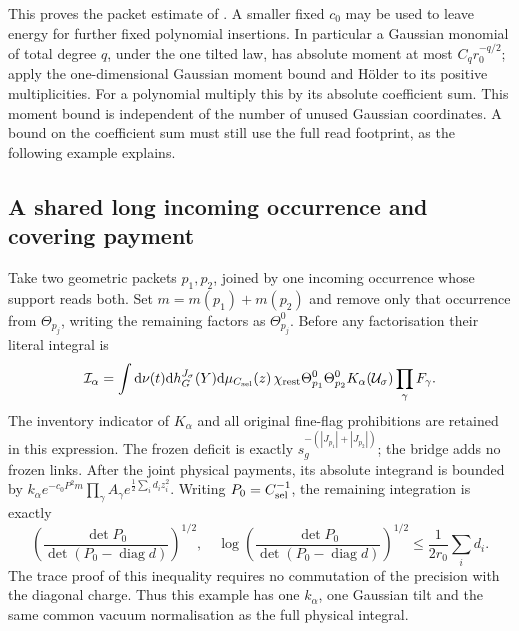 \documentclass[11pt,reqno]{amsart}
\numberwithin{equation}{section}
\theoremstyle{definition}
\theoremstyle{remark}
\newcommand{\dd}{\mathrm d}
\begin{document}
This proves the packet estimate of
\cite[Theorem~30.8, p.~182]{Main}. A smaller fixed \(c_0\)
may be used to leave energy for further fixed polynomial
insertions. In particular a Gaussian monomial of total degree
\(q\), under the one tilted law, has absolute moment at most
\(C_qr_0^{-q/2}\); apply the one-dimensional Gaussian moment
bound and H\"older to its positive multiplicities. For a
polynomial multiply this by its absolute coefficient sum.
This moment bound is independent of the number of unused
Gaussian coordinates. A bound on the coefficient sum must
still use the full read footprint, as the following example
explains.

\subsection{A shared long incoming occurrence and covering payment}

Take two geometric packets \(p_1,p_2\), joined by one incoming
occurrence whose support reads both. Set \(m=m(p_1)+m(p_2)\)
and remove only that occurrence from \(\Theta_{p_j}\), writing
the remaining factors as \(\Theta_{p_j}^0\). Before any
factorisation their literal integral is
\[
 \mathcal I_\alpha=\int\dd\nu(t)\dd h_G^{J_\sigma}(Y)
        \dd\mu_{C_{\rm sel}}(z)\,
       \chi_{\rm rest}\Theta_{p_1}^0\Theta_{p_2}^0
                      K_\alpha(\mathcal U_\sigma)\prod_\gamma F_\gamma.
\]
The inventory indicator of \(K_\alpha\) and all original
fine-flag prohibitions are retained in this expression.
The frozen deficit is exactly
\(s_g^{-(|J_{p_1}|+|J_{p_2}|)}\); the bridge adds no frozen
links. After the joint physical payments, its absolute integrand
is bounded by
\(k_\alpha e^{-c_0P^2m}\prod_\gamma A_\gamma
 e^{\frac12\sum_i d_i z_i^2}\).
Writing \(P_0=C_{\rm sel}^{-1}\), the remaining integration is
exactly
\[
 \left(\frac{\det P_0}{\det(P_0-\operatorname{diag}d)}\right)^{1/2},
 \quad
 \log\left(\frac{\det P_0}{\det(P_0-\operatorname{diag}d)}\right)^{1/2}
       \le\frac1{2r_0}\sum_i d_i.
\]
The trace proof of this inequality requires no commutation of
the precision with the diagonal charge. Thus this example has
one \(k_\alpha\), one Gaussian tilt and the same common vacuum
normalisation as the full physical integral.
\end{document}
